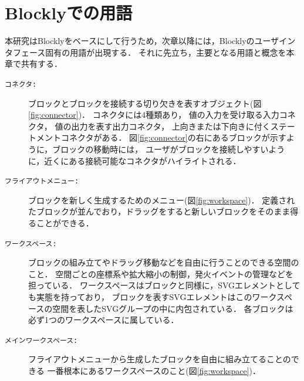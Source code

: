 \chapter{Blocklyでの用語}\label{chap:blocklyWord}

本研究はBlocklyをベースにして行うため，次章以降には，Blocklyのユーザインタフェース固有の用語が出現する．
それに先立ち，主要となる用語と概念を本章で共有する．

\begin{description}
 \item[{\tt コネクタ:}]
ブロックとブロックを接続する切り欠きを表すオブジェクト(図\ref{fig:connector})．
コネクタには4種類あり，
値の入力を受け取る入力コネクタ，
値の出力を表す出力コネクタ，
上向きまたは下向きに付くステートメントコネクタがある．
図\ref{fig:connector}の右にあるブロックが示すように，ブロックの移動時には，
ユーザがブロックを接続しやすいように，近くにある接続可能なコネクタがハイライトされる．

 \item[{\tt フライアウトメニュー:}]
ブロックを新しく生成するためのメニュー(図\ref{fig:workspace})．
定義されたブロックが並んでおり，ドラッグをすると新しいブロックをそのまま得ることができる．

 \item[{\tt ワークスペース:}]
ブロックの組み立てやドラッグ移動などを自由に行うことのできる空間のこと．
空間ごとの座標系や拡大縮小の制御，発火イベントの管理などを担っている．
ワークスペースはブロックと同様に，SVGエレメントとしても実態を持っており，
ブロックを表すSVGエレメントはこのワークスペースの空間を表したSVGグループの中に内包されている．
各ブロックは必ず1つのワークスペースに属している．

 \item[{\tt メインワークスペース:}]
フライアウトメニューから生成したブロックを自由に組み立てることのできる
一番根本にあるワークスペースのこと(図\ref{fig:workspace})．

\end{description}

